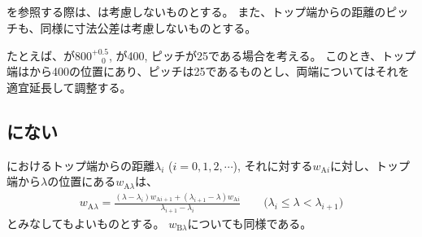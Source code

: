 \subsection{\IDTaperTableTolerance}
\IDTaperTable を参照する際は、\WorkTotalLengthTolerance は考慮しないものとする。
また、トップ端からの距離のピッチも、同様に寸法公差は考慮しないものとする。
\begin{hosoku}
たとえば、\WorkTotalLength が$800^{+0.5}_{\phantom -0}$, \TopAlocationLength が400, ピッチが25である場合を考える。
このとき、トップ端は\AlocationCenter から400の位置にあり、ピッチは25であるものとし、両端についてはそれを適宜延長して調整する。
\end{hosoku}

\subsection{\IDTaperTable にない\InnerDiameter}
\nameIDTaperTable におけるトップ端からの距離$\lambda_i$ ($i = 0, 1, 2, \cdots$), それに対する\ACID $w_{\mathrm Ai}$に対し、トップ端から$\lambda$の位置にある\ACID$w_{\mathrm A\lambda}$は、
\begin{align*}
  w_{\mathrm A\lambda}
  = \frac{(\lambda-\lambda_i)w_{\mathrm Ai+1}+(\lambda_{i+1}-\lambda)w_{\mathrm Ai}}{\lambda_{i+1}-\lambda_i}
  \qquad
  \Big(\lambda_i \leq \lambda < \lambda_{i+1}\Big)
\end{align*}
とみなしてもよいものとする。
\BDID$w_{\mathrm B\lambda}$についても同様である。


